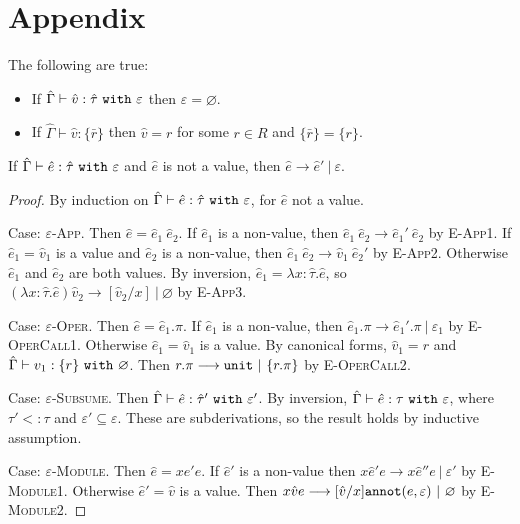 \chapter{Appendix}

\begin{lemma}
The following are true:
\begin{itemize}
	\setlength\itemsep{-0.7em}
	\item If $\hat \Gamma \vdash \hat v: \hat \tau~\mathtt{with}~ \varepsilon$ then $\varepsilon = \varnothing$.
	\item If $\hat \Gamma \vdash \hat v: \{ \bar r \}$ then $\hat v = r$ for some $r \in R$ and $\{ \bar r \} = \{ r \}$.
\end{itemize}
\end{lemma}


\begin{theorem}[Progress]
If $\hat \Gamma \vdash \hat e: \hat \tau~\mathtt{with}~ \varepsilon$ and $\hat e$ is not a value, then $\hat e \longrightarrow \hat e'~|~\varepsilon$.
\end{theorem}

\begin{proof} By induction on $\hat \Gamma \vdash \hat e: \hat \tau~\mathtt{with}~ \varepsilon$, for $\hat e$ not a value.

Case: \textsc{$\varepsilon$-App}. Then $\hat e = \hat e_1~\hat e_2$. If $\hat e_1$ is a non-value, then $\hat e_1~\hat e_2 \longrightarrow \hat e_1'~\hat e_2$ by \textsc{E-App1}. If $\hat e_1 = \hat v_1$ is a value and $\hat e_2$ is a non-value, then $\hat e_1~\hat e_2 \longrightarrow \hat v_1~\hat e_2'$ by \textsc{E-App2}. Otherwise $\hat e_1$ and $\hat e_2$ are both values. By inversion, $\hat e_1 = \lambda x: \hat \tau . \hat e$, so $(\lambda x: \hat \tau. \hat e) \hat v_2 \longrightarrow [\hat v_2/x]~|~\varnothing$ by \textsc{E-App3}.

Case: \textsc{$\varepsilon$-Oper}. Then $\hat e = \hat e_1.\pi$. If $\hat e_1$ is a non-value, then $\hat e_1.\pi \longrightarrow \hat e_1'.\pi~|~\varepsilon_1$ by \textsc{E-OperCall1}. Otherwise $\hat e_1 = \hat v_1$ is a value. By canonical forms, $\hat v_1 = r$ and $\hat \Gamma \vdash v_1: \{ r \}~\mathtt{with}~ \varnothing$. Then $r.\pi \longrightarrow \mathtt{unit}~|~\{ r.\pi \}$ by \textsc{E-OperCall2}.

Case: \textsc{$\varepsilon$-Subsume}. Then $\hat \Gamma \vdash \hat e: \hat \tau'~\mathtt{with}~ \varepsilon'$. By inversion, $\hat \Gamma \vdash \hat e: \tau~\mathtt{with}~ \varepsilon$, where $\tau' <: \tau$ and $\varepsilon' \subseteq \varepsilon$. These are subderivations, so the result holds by inductive assumption.

Case: \textsc{$\varepsilon$-Module}. Then $\hat e = {x}{\hat e'}{e}$. If $\hat e'$ is a non-value then ${x}{\hat e'}{e} \longrightarrow {x}{\hat e''}{e}~|~\varepsilon'$ by \textsc{E-Module1}. Otherwise $\hat e' = \hat v$ is a value. Then ${x}{\hat v}{e} \longrightarrow [\hat v/x]\mathtt{annot}(e, \varepsilon)~|~\varnothing$ by \textsc{E-Module2}.
\end{proof}




